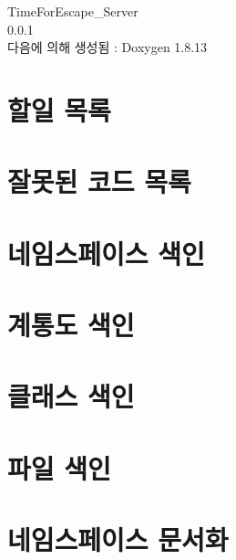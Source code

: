 \documentclass[twoside]{book}
\newcommand{\+}{\discretionary{\mbox{\scriptsize$\hookleftarrow$}}{}{}}
\newcommand{\clearemptydoublepage}{%
  \newpage{\pagestyle{empty}\cleardoublepage}%
}
\begin{document}
\hypersetup{pageanchor=false,
             bookmarksnumbered=true,
             pdfencoding=unicode
            }
\begin{titlepage}
\vspace*{7cm}
\begin{center}%
{\Large Time\+For\+Escape\+\_\+\+Server \\[1ex]\large 0.\+0.\+1 }\\
\vspace*{1cm}
{\large 다음에 의해 생성됨 \+:  Doxygen 1.8.13}\\
\end{center}
\end{titlepage}
\clearemptydoublepage
{}
\tableofcontents
\clearemptydoublepage
{}
\hypersetup{pageanchor=true}

\chapter{할일 목록}
\label{todo}

\chapter{잘못된 코드 목록}
\label{deprecated}

\chapter{네임스페이스 색인}

\chapter{계통도 색인}

\chapter{클래스 색인}

\chapter{파일 색인}

\chapter{네임스페이스 문서화}



\end{document}

